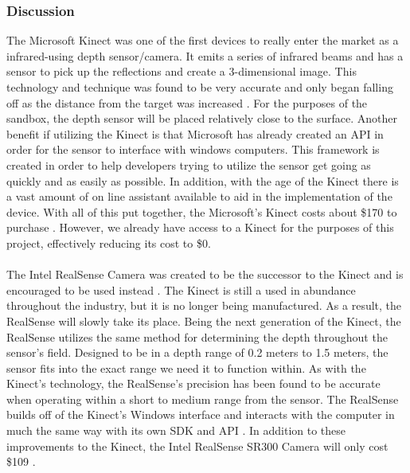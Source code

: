 \subsubsection{Discussion}

The Microsoft Kinect was one of the first devices to really enter the market as a infrared-using depth sensor/camera.
It emits a series of infrared beams and has a sensor to pick up the reflections and create a 3-dimensional image.
This technology and technique was found to be very accurate and only began falling off as the distance from the target was increased .
For the purposes of the sandbox, the depth sensor will be placed relatively close to the surface.
Another benefit if utilizing the Kinect is that Microsoft has already created an API in order for the sensor to interface with windows computers.
This framework is created in order to help developers trying to utilize the sensor get going as quickly and as easily as possible.
In addition, with the age of the Kinect there is a vast amount of on line assistant available to aid in the implementation of the device.
With all of this put together, the Microsoft's Kinect costs about \$170 to purchase .
However, we already have access to a Kinect for the purposes of this project, effectively reducing its cost to \$0.
\\\\
The Intel RealSense Camera was created to be the successor to the Kinect and is encouraged to be used instead .
The Kinect is still a used in abundance throughout the industry, but it is no longer being manufactured.
As a result, the RealSense will slowly take its place.
Being the next generation of the Kinect, the RealSense utilizes the same method for determining the depth throughout the sensor's field.
Designed to be in a depth range of 0.2 meters to 1.5 meters, the sensor fits into the exact range we need it to function within.
As with the Kinect's technology, the RealSense's precision has been found to be accurate when operating within a short to medium range from the sensor.
The RealSense builds off of the Kinect's Windows interface and interacts with the computer in much the same way with its own SDK and API .
In addition to these improvements to the Kinect, the Intel RealSense SR300 Camera will only cost \$109 .
